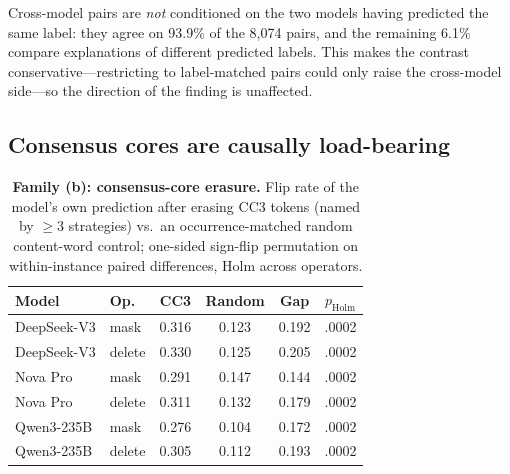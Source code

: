\documentclass[11pt]{article}
\begin{document}
Cross-model pairs are \emph{not} conditioned on the two models having predicted the same label: they agree on 93.9\% of the 8{,}074 pairs, and the remaining 6.1\% compare explanations of different predicted labels. This makes the contrast conservative---restricting to label-matched pairs could only raise the cross-model side---so the direction of the finding is unaffected.

\subsection{Consensus cores are causally load-bearing}
\label{sec:erasure}

\begin{table}[t]
\centering
\small
\setlength{\tabcolsep}{4.5pt}
\begin{tabular}{llcccc}
\toprule
Model & Op. & CC3 & Random & Gap & $p_{\mathrm{Holm}}$ \\
\midrule
DeepSeek-V3 & mask   & 0.316 & 0.123 & 0.192 & .0002 \\
DeepSeek-V3 & delete & 0.330 & 0.125 & 0.205 & .0002 \\
Nova Pro    & mask   & 0.291 & 0.147 & 0.144 & .0002 \\
Nova Pro    & delete & 0.311 & 0.132 & 0.179 & .0002 \\
Qwen3-235B  & mask   & 0.276 & 0.104 & 0.172 & .0002 \\
Qwen3-235B  & delete & 0.305 & 0.112 & 0.193 & .0002 \\
\bottomrule
\end{tabular}
\caption{\textbf{Family (b): consensus-core erasure.} Flip rate of the model's own prediction after erasing CC3 tokens (named by $\ge$3 strategies) vs.\ an occurrence-matched random content-word control; one-sided sign-flip permutation on within-instance paired differences, Holm across operators.}
\label{tab:erasure}
\end{table}
\end{document}
